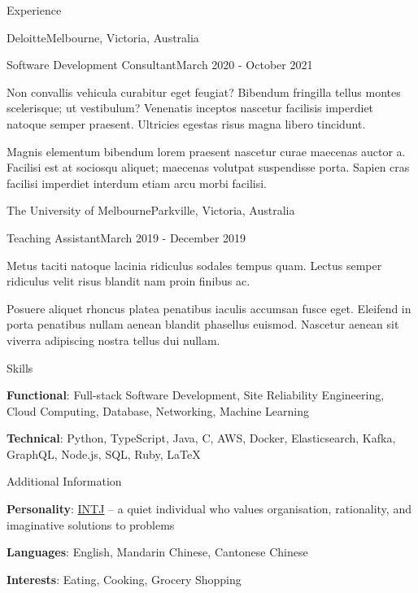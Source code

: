\documentclass{xsha}
\begin{document}
\begin{xsection}{Experience}
\begin{xheading}{Deloitte}{Melbourne, Victoria, Australia}
\begin{xsubheading}{Software Development Consultant}{March 2020 - October 2021}
\item Non convallis vehicula curabitur eget feugiat? Bibendum fringilla tellus montes scelerisque; ut vestibulum? Venenatis inceptos nascetur facilisis imperdiet natoque semper praesent. Ultricies egestas risus magna libero tincidunt.
\item Magnis elementum bibendum lorem praesent nascetur curae maecenas auctor a. Facilisi est at sociosqu aliquet; maecenas volutpat suspendisse porta. Sapien cras facilisi imperdiet interdum etiam arcu morbi facilisi.
\end{xsubheading}
\end{xheading}

\begin{xheading}{The University of Melbourne}{Parkville, Victoria, Australia}
\begin{xsubheading}{Teaching Assistant}{March 2019 - December 2019}
\item Metus taciti natoque lacinia ridiculus sodales tempus quam. Lectus semper ridiculus velit risus blandit nam proin finibus ac.
\item Posuere aliquet rhoncus platea penatibus iaculis accumsan fusce eget. Eleifend in porta penatibus nullam aenean blandit phasellus euismod. Nascetur aenean sit viverra adipiscing nostra tellus dui nullam.
\end{xsubheading}
\end{xheading}

\end{xsection}

\begin{xsection}{Skills}
\item \textbf{Functional}: Full-stack Software Development, Site Reliability Engineering, Cloud Computing, Database, Networking, Machine Learning
\item \textbf{Technical}: Python, TypeScript, Java, C, AWS, Docker, Elasticsearch, Kafka, GraphQL, Node.js, SQL, Ruby, \LaTeX
\end{xsection}

\begin{xsection}{Additional Information}
\item \textbf{Personality}: \href{https://www.16personalities.com/intj-personality}{INTJ} -- a quiet individual who values organisation, rationality, and imaginative solutions to problems
\item \textbf{Languages}: English, Mandarin Chinese, Cantonese Chinese
\item \textbf{Interests}: Eating, Cooking, Grocery Shopping
\end{xsection}
\end{document}
